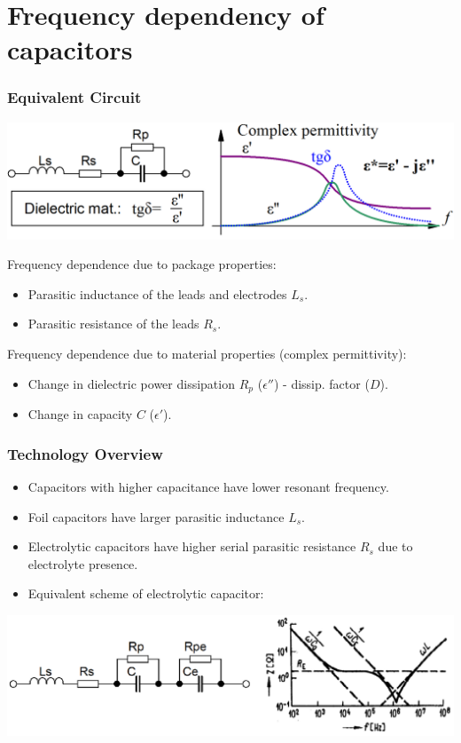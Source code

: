 \documentclass{beamer}
\begin{document}
\section{\texorpdfstring{Frequency dependency of capacitors}{Frequency dependency of capacitors}}
	\begin{frame}
    \frametitle{Equivalent Circuit}
		\begin{center}
		\includegraphics[scale=0.25]{obr07_ekvSchC.png}
		\end{center}
		\small
		Frequency dependence due to package properties:
		\begin{itemize}
			\item Parasitic inductance of the leads and electrodes $L_s$.
			\item Parasitic resistance of the leads $R_s$.
		\end{itemize}
		Frequency dependence due to material properties (complex permittivity):
		\begin{itemize}
			\item Change in dielectric power dissipation $R_p$ ($\epsilon ''$) - dissip. factor ($D$).
			\item Change in capacity $C$ ($\epsilon '$).
		\end{itemize}
	\end{frame}
	\begin{frame}
    \frametitle{Technology Overview}
		
		\begin{itemize}
			\item Capacitors with higher capacitance have lower resonant frequency.
			\item Foil capacitors have larger parasitic inductance $L_s$.
			\item Electrolytic capacitors have higher serial parasitic resistance $R_s$ due to electrolyte presence.
			\item Equivalent scheme of electrolytic capacitor:
		\end{itemize}
		\begin{center}
		\includegraphics[scale=0.3]{obr08_ekvSchCe.png}
		\end{center}
	\end{frame}
\end{document}
